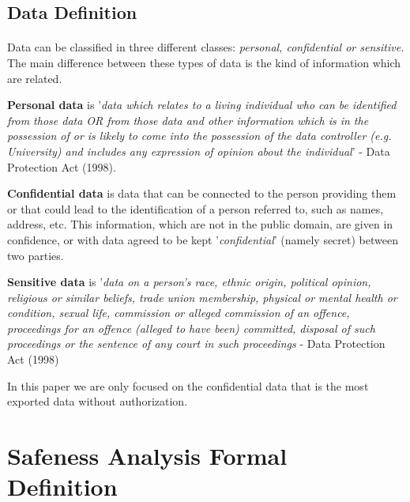 \documentclass[letterpaper,twocolumn,10pt]{article}
\begin{document}
\subsection{Data Definition}
\paragraph{}
Data can be classified in three different classes: \textit{personal, confidential or sensitive.} The main difference between these types of data is the kind of information which are related. 

\textbf{Personal data} is '\emph{data which relates to a living individual who can be identified from those data OR from those data and other information which is in the possession of or is likely to come into the possession of the data controller (e.g. University) and includes any expression of opinion about the individual}' - Data Protection Act (1998).

\textbf{Confidential data} is data that can be connected to the person providing them or that could lead to the identification of a person referred to, such as names, address, etc. This information, which are not in the public domain, are given in confidence, or with data agreed to be kept '\textit{confidential}' (namely secret) between two parties. 

\textbf{Sensitive data} is '\emph{data on a person's race, ethnic origin, political opinion, religious or similar beliefs, trade union membership, physical or mental health or condition, sexual life, commission or alleged commission of an offence, proceedings for an offence (alleged to have been) committed, disposal of such proceedings or the sentence of any court in such proceedings} - Data Protection Act (1998)

In this paper we are only focused on the confidential data that is the most exported data without authorization.


\section{Safeness Analysis Formal Definition}
\end{document}

